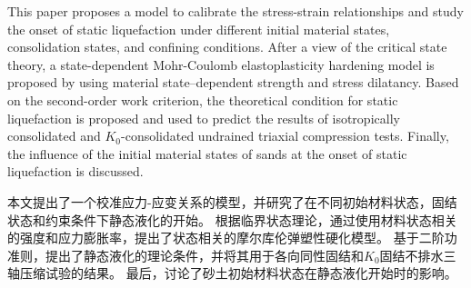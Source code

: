 \begin{ParaColumn}
    \switchcolumn*

    This paper proposes a model to calibrate the stress-strain relationships and study the onset of static liquefaction under different initial material states, consolidation states, and confining conditions. After a view of the critical state theory, a state-dependent Mohr-Coulomb elastoplasticity hardening model is proposed by using material state–dependent strength and stress dilatancy. Based on the second-order work criterion, the theoretical condition for static liquefaction is proposed and used to predict the results of isotropically consolidated and $K_0$-consolidated undrained triaxial compression tests. Finally, the influence of the initial material states of sands at the onset of static liquefaction is discussed.

    \switchcolumn

    本文提出了一个校准应力-应变关系的模型，并研究了在不同初始材料状态，固结状态和约束条件下静态液化的开始。 根据临界状态理论，通过使用材料状态相关的强度和应力膨胀率，提出了状态相关的摩尔库伦弹塑性硬化模型。 基于二阶功准则，提出了静态液化的理论条件，并将其用于各向同性固结和$K_0$固结不排水三轴压缩试验的结果。 最后，讨论了砂土初始材料状态在静态液化开始时的影响。

\end{ParaColumn}